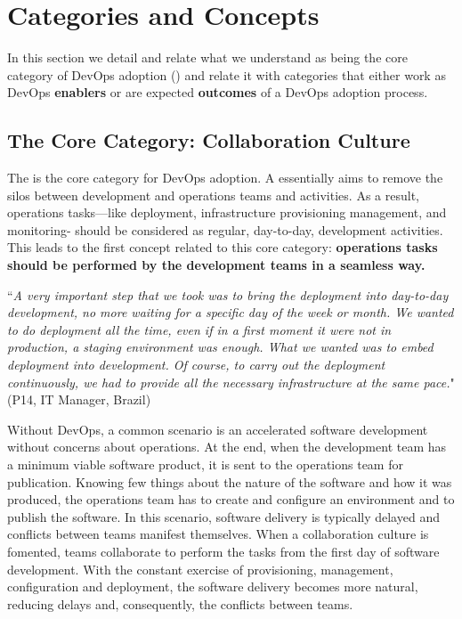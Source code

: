 \section{Categories and Concepts} \label{sec:categories_concepts}

In this section we detail and relate
what we understand as being the core category
of DevOps adoption ()
and relate it with categories that either work as DevOps {\bf enablers} or
are expected {\bf outcomes} of a DevOps adoption process.

\subsection{The Core Category: Collaboration Culture}

The  is the core category
for DevOps adoption. A  essentially aims to remove
the silos between development and operations teams and activities.
As a result, operations tasks---like deployment, infrastructure provisioning
management, and monitoring- should be considered as regular, day-to-day,
development activities. This leads to the first concept related to
this core category: {\bf operations tasks should be performed by
the development teams in a seamless way.}

\begin{mq}
``\emph{A very important step that we took was to bring the deployment into day-to-day
development, no more waiting for a specific day of the week or month. We wanted
to do deployment all the time, even if in a first moment it were not in
production, a staging environment was enough. What we wanted was to embed
deployment into development. Of course, to carry out the deployment
continuously, we had to provide all the necessary infrastructure at the same
pace.}" (P14, IT Manager, Brazil)
\end{mq}

Without DevOps, a common scenario is an accelerated software development
without concerns about operations. At the end, when the development team has a
minimum viable software product, it is sent to the operations team for
publication. Knowing few things about the nature of the software and how it
was produced, the operations team has to create and configure an environment
and to publish the software. In this scenario, software delivery is typically
delayed and conflicts between teams manifest themselves. When a collaboration
culture is fomented, teams collaborate to perform the tasks from the first day
of software development. With the constant exercise of provisioning, management,
configuration and deployment, the software delivery becomes more natural,
reducing delays and, consequently, the conflicts between teams.

